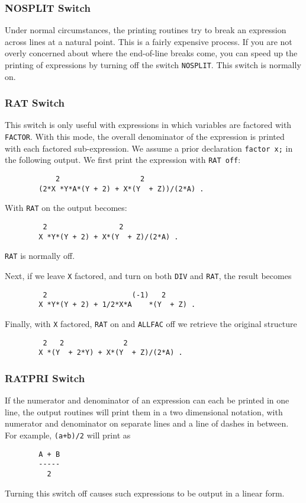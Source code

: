 \subsubsection{NOSPLIT Switch}

Under normal circumstances, the printing routines try to break an expression
across lines at a natural point.  This is a fairly expensive process.  If
you are not overly concerned about where the end-of-line breaks come, you
can speed up the printing of expressions by turning off the switch
{\tt NOSPLIT}.  This switch is normally on.

\subsubsection{RAT Switch}

This switch is only useful with expressions in which variables are
factored with {\tt FACTOR}. With this mode, the overall denominator of the
expression is printed with each factored sub-expression. We assume a prior
declaration {\tt factor x;} in the following output. We first print the
expression with {\tt RAT off}:
\begin{verbatim}
            2                   2
        (2*X *Y*A*(Y + 2) + X*(Y  + Z))/(2*A) .
\end{verbatim}
With {\tt RAT} on the output becomes:
\extendedmanual{\newpage}
\begin{verbatim}
         2                 2
        X *Y*(Y + 2) + X*(Y  + Z)/(2*A) .
\end{verbatim}
{\tt RAT} is normally off.

Next, if we leave {\tt X} factored, and turn on both {\tt DIV} and
{\tt RAT}, the result becomes
\begin{verbatim}
         2                    (-1)   2
        X *Y*(Y + 2) + 1/2*X*A    *(Y  + Z) .
\end{verbatim}
Finally, with {\tt X} factored, {\tt RAT} on and {\tt ALLFAC}
off we retrieve the original structure
\begin{verbatim}
         2   2              2
        X *(Y  + 2*Y) + X*(Y  + Z)/(2*A) .
\end{verbatim}

\subsubsection{RATPRI Switch}

If the numerator and denominator of an expression can each be printed in
one line, the output routines will print them in a two dimensional
notation, with numerator and denominator on separate lines and a line of
dashes in between. For example, {\tt (a+b)/2} will print as
\begin{verbatim}
        A + B
        -----
          2
\end{verbatim}
Turning this switch off causes such expressions to be output in a linear
form.

